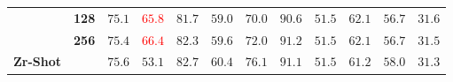 \begin{table}
\begin{center}
\begin{tabular}{l c c c c c c c c c c c}
 & \textbf{128} & $75.1$ & \textcolor{red}{$65.8$} & $81.7$ & $59.0$ & $70.0$ & $90.6$ & $51.5$ & $62.1$ & $56.7$ & $31.6$ \\
 & \textbf{256} & $75.4$ & \textcolor{red}{$66.4$} & $82.3$ & $59.6$ & $72.0$ & $91.2$ & $51.5$ & $62.1$ & $56.7$ & $31.5$ \\
\midrule
\midrule
\textbf{Zr-Shot} & & $75.6$ & $53.1$ & $82.7$ & $60.4$ & $76.1$ & $91.1$ & $51.5$ & $61.2$ & $58.0$ & $31.3$ \\
\bottomrule
\end{tabular}
\endgroup
\end{center}
\vskip -0.1in
\end{table}